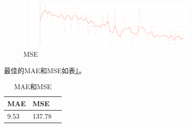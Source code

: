 \documentclass{article}
\begin{document}
\begin{figure}[H]
    \centering
    \includegraphics[width=0.8\textwidth]{figures/mse.png}
    \caption{MSE}
    \label{mse}
\end{figure}

最佳的MAE和MSE如表\ref{maemse}。

\begin{table}[h]
    \centering
    \begin{tabular}{lll}
        \hline
        \textbf{MAE} & \textbf{MSE} \\
        \hline
        9.53         & 137.78       \\
        \hline
    \end{tabular}
    \label{maemse}
    \caption{MAE和MSE}
\end{table}
\end{document}
